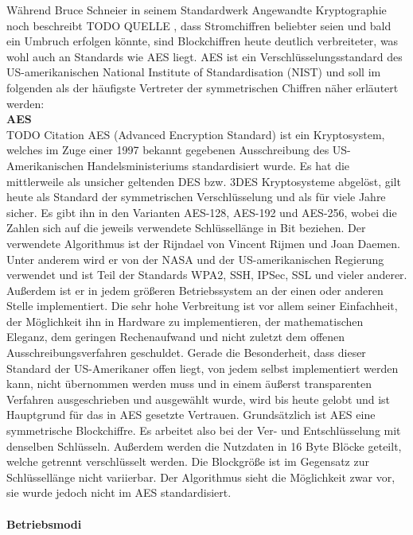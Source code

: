 \documentclass[12pt,a4paper,bibliography=totocnumbered,listof=totocnumbered]{scrartcl}
\begin{document}
Während Bruce Schneier in seinem Standardwerk Angewandte Kryptographie noch beschreibt TODO QUELLE , dass Stromchiffren beliebter seien und bald ein Umbruch erfolgen könnte, sind Blockchiffren heute deutlich verbreiteter, was wohl auch an Standards wie AES liegt. AES ist ein Verschlüsselungsstandard des US-amerikanischen National Institute of Standardisation (NIST) und soll im folgenden als der häufigste Vertreter der symmetrischen Chiffren näher erläutert werden:
\\\textbf{AES}\\ TODO Citation \cite{4}
AES (Advanced Encryption Standard) ist ein Kryptosystem, welches im Zuge einer 1997 bekannt gegebenen Ausschreibung des US-Amerikanischen Handelsministeriums standardisiert wurde. Es hat die mittlerweile als unsicher geltenden DES bzw. 3DES Kryptosysteme abgelöst, gilt heute als Standard der symmetrischen Verschlüsselung und als für viele Jahre sicher. Es gibt ihn in den Varianten AES-128, AES-192 und AES-256, wobei die Zahlen sich auf die jeweils verwendete Schlüssellänge in Bit beziehen. Der verwendete Algorithmus ist der Rijndael von Vincent Rijmen und Joan Daemen. Unter anderem wird er von der NASA und der US-amerikanischen Regierung verwendet und ist Teil der Standards WPA2, SSH, IPSec, SSL und vieler anderer. Außerdem ist er in jedem größeren Betriebssystem an der einen oder anderen Stelle implementiert. Die sehr hohe Verbreitung ist vor allem seiner Einfachheit, der Möglichkeit ihn in Hardware zu implementieren, der mathematischen Eleganz, dem geringen Rechenaufwand und nicht zuletzt dem offenen Ausschreibungsverfahren geschuldet. Gerade die Besonderheit, dass dieser Standard der US-Amerikaner offen liegt, von jedem selbst implementiert werden kann, nicht übernommen werden muss und in einem äußerst transparenten Verfahren ausgeschrieben und ausgewählt wurde, wird bis heute gelobt und ist Hauptgrund für das in AES gesetzte Vertrauen. Grundsätzlich ist AES eine symmetrische Blockchiffre. Es arbeitet also bei der Ver- und Entschlüsselung mit denselben Schlüsseln. Außerdem werden die Nutzdaten in 16 Byte Blöcke geteilt, welche getrennt verschlüsselt werden. Die Blockgröße ist im Gegensatz zur Schlüssellänge nicht variierbar. Der Algorithmus sieht die Möglichkeit zwar vor, sie wurde jedoch nicht im AES standardisiert.
\\\\\textbf{Betriebsmodi}\\
\end{document}
